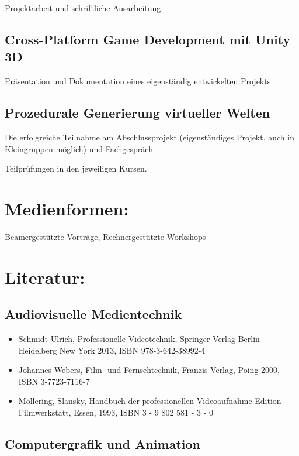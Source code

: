 Projektarbeit und schriftliche Ausarbeitung

\subsection*{Cross-Platform Game Development mit Unity
3D}\label{cross-platform-game-development-mit-unity-3d-2}

Präsentation und Dokumentation eines eigenständig entwickelten Projekts

\subsection*{Prozedurale Generierung virtueller
Welten}\label{prozedurale-generierung-virtueller-welten-2}

Die erfolgreiche Teilnahme am Abschlussprojekt (eigenständiges Projekt,
auch in Kleingruppen möglich) und Fachgespräch

Teilprüfungen in den jeweiligen Kursen.

\section*{Medienformen:}\label{medienformen-16}

Beamergestützte Vorträge, Rechnergestützte Workshops

\section*{Literatur:}\label{literatur-21}

\subsection*{Audiovisuelle
Medientechnik}\label{audiovisuelle-medientechnik-3}

\begin{itemize}
\tightlist
\item
  Schmidt Ulrich, Professionelle Videotechnik, Springer-Verlag Berlin
  Heidelberg New York 2013, ISBN 978-3-642-38992-4
\item
  Johannes Webers, Film- und Fernsehtechnik, Franzis Verlag, Poing 2000,
  ISBN 3-7723-7116-7
\item
  Möllering, Slansky, Handbuch der professionellen Videoaufnahme Edition
  Filmwerkstatt, Essen, 1993, ISBN 3 - 9 802 581 - 3 - 0
\end{itemize}

\subsection*{Computergrafik und
Animation}\label{computergrafik-und-animation-3}

